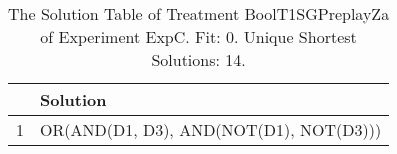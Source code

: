 \begin{table}[ht]
\centering
\begin{tabular}{rp{9cm}}
  \hline
 & Solution \\ 
  \hline
1 & OR(AND(D1, D3), AND(NOT(D1), NOT(D3))) \\ 
   \hline
\end{tabular}
\caption{The Solution Table of Treatment BoolT1SGPreplayZa of Experiment ExpC. Fit: 0. Unique Shortest Solutions: 14.} 
\end{table}
